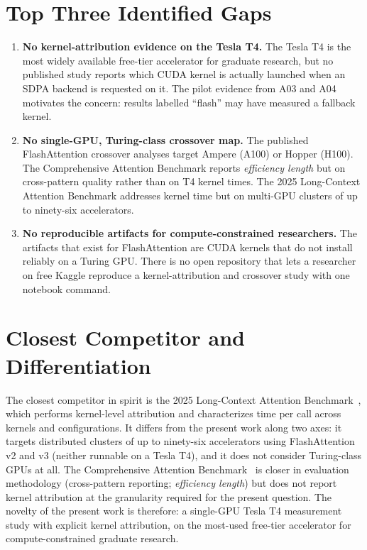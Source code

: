 \documentclass[11pt]{article}
\begin{document}
\section{Top Three Identified Gaps}

\begin{enumerate}[leftmargin=2em]
    \item \textbf{No kernel-attribution evidence on the Tesla T4.} The Tesla T4 is the most widely available free-tier accelerator for graduate research, but no published study reports which CUDA kernel is actually launched when an SDPA backend is requested on it. The pilot evidence from A03 and A04 motivates the concern: results labelled \enquote{flash} may have measured a fallback kernel.
    \item \textbf{No single-GPU, Turing-class crossover map.} The published FlashAttention crossover analyses target Ampere (A100) or Hopper (H100). The Comprehensive Attention Benchmark reports \emph{efficiency length} but on cross-pattern quality rather than on T4 kernel times. The 2025 Long-Context Attention Benchmark addresses kernel time but on multi-GPU clusters of up to ninety-six accelerators.
    \item \textbf{No reproducible artifacts for compute-constrained researchers.} The artifacts that exist for FlashAttention are CUDA kernels that do not install reliably on a Turing GPU. There is no open repository that lets a researcher on free Kaggle reproduce a kernel-attribution and crossover study with one notebook command.
\end{enumerate}

\section{Closest Competitor and Differentiation}

The closest competitor in spirit is the 2025 Long-Context Attention Benchmark~\parencite{bu2025longcontextattentionbenchmark}, which performs kernel-level attribution and characterizes time per call across kernels and configurations. It differs from the present work along two axes: it targets distributed clusters of up to ninety-six accelerators using FlashAttention v2 and v3 (neither runnable on a Tesla T4), and it does not consider Turing-class GPUs at all. The Comprehensive Attention Benchmark~\parencite{zhang2025cabcomprehensiveattentionbenchmarking} is closer in evaluation methodology (cross-pattern reporting; \textit{efficiency length}) but does not report kernel attribution at the granularity required for the present question. The novelty of the present work is therefore: a single-GPU Tesla T4 measurement study with explicit kernel attribution, on the most-used free-tier accelerator for compute-constrained graduate research.
\end{document}

